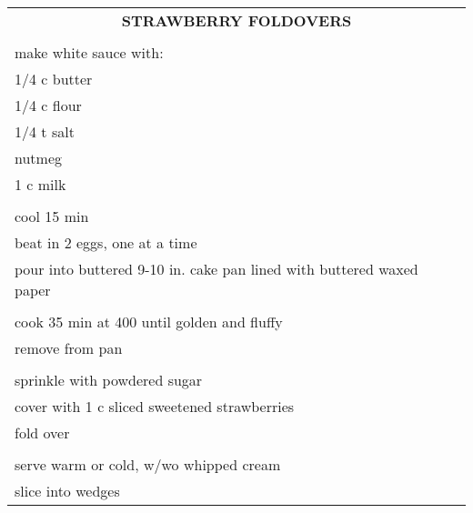 \documentclass[8pt]{report}
\begin{document}
\centering

\begin{tabular}{|l|} \hline	%
 
\multicolumn{1}{|c|}{\textbf{STRAWBERRY FOLDOVERS}}
\\
\\

\index{desserts!strawberry foldovers} \index{strawberry foldovers}

make white sauce with:\\
\hspace{0.5 in}	1/4 c butter\\
\hspace{0.5 in}	1/4 c flour\\
\hspace{0.5 in}	1/4 t salt\\
\hspace{0.5 in}	nutmeg\\
\hspace{0.5 in}	1 c milk\\
\\
cool 15 min\\
beat in 2 eggs, one at a time\\
pour into buttered 9-10 in. cake pan lined with buttered waxed paper\\
\\
cook 35 min at 400 until golden and fluffy\\
remove from pan\\
\\
sprinkle with powdered sugar\\
cover with 1 c sliced sweetened strawberries\\
fold over\\
\\
serve warm or cold, w/wo whipped cream\\
slice into wedges\\



\hline

\end{tabular}

\newpage

\centering
\end{document}
